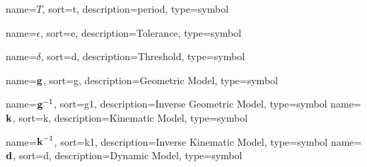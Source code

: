 	{%
		name={\ensuremath{T}},
		sort=t,
		description=period,
		type=symbol
	}
	\newcommand{\period}{\gls{sym:period}}

	{%
		name={\ensuremath{\epsilon}},
		sort=e,
		description=Tolerance,
		type=symbol
	}
	\newcommand{\tol}{\gls{sym:tolerance}}

	{%
		name={\ensuremath{\delta}},
		sort=d,
		description=Threshold,
		type=symbol
	}
	\newcommand{\threshold}{\gls{sym:threshold}}

	{%
		name={\ensuremath{\vecfunc{g}}},
		sort=g,
		description=Geometric Model,
		type=symbol
	}
	\newcommand{\geometricmodel}{\gls{sym:geometricmodel}}

	{%
		name={\ensuremath{{\vecfunc{g}^{-1}}}},
		sort=g1,
		description=Inverse Geometric Model,
		type=symbol
	}
	\newcommand{\invgeometricmodel}{\gls{sym:invgeometricmodel}}
	{%
		name={\ensuremath{\vecfunc{k}}},
		sort=k,
		description=Kinematic Model,
		type=symbol
	}
	\newcommand{\kinematicmodel}{\gls{sym:kinematicmodel}}

	{%
		name={\ensuremath{{\vecfunc{k}^{-1}}}},
		sort=k1,
		description=Inverse Kinematic Model,
		type=symbol
	}
	\newcommand{\invkinematicmodel}{\gls{sym:invkinematicmodel}}
	{%
		name={\ensuremath{\vecfunc{d}}},
		sort=d,
		description=Dynamic Model,
		type=symbol
	}
	\newcommand{\dynamicmodel}{\gls{sym:dynamicmodel}}

